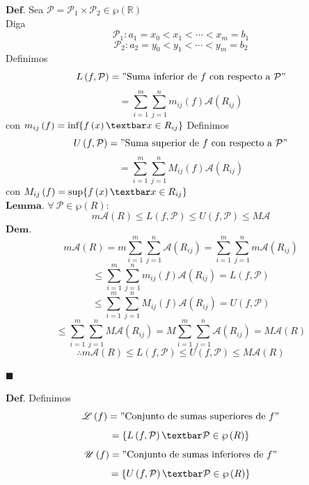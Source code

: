 \documentclass[10pt,a4paper]{article}
\begin{document}
\color{red} 
$\mathbf{Def.}$
\color{black} 
Sea $\mathcal{P} = \mathcal{P_1} \times \mathcal{P_2} \in \wp \left( \mathbb{R} \right)  $ \\
Diga 
$$\mathcal{P}_1: a_1 =x_0 <x_1< \cdots < x_m = b_1  $$
$$\mathcal{P}_2: a_2 =y_0 <y_1< \cdots < y_m = b_2  $$
Definimos 
$$ L \left( f, \mathcal{P} \right) = "\text{Suma inferior de $f$ con respecto a } \mathcal{P} " $$
$$ = \sum_{i=1}^{m} \sum_{j=1}^{n} m_{ij} \left( f \right) \mathcal{A} \left( R_{ij} \right)  $$
con $ m_{ij} \left( f \right) = \text{inf} \{ f \left( x \right) \textbar x \in R_{ij} \}   $ 
\newpage
Definimos 
$$ U \left( f, \mathcal{P} \right) = "\text{Suma superior de $f$ con respecto a } \mathcal{P} " $$
$$ = \sum_{i=1}^{m} \sum_{j=1}^{n} M_{ij} \left( f \right) \mathcal{A} \left( R_{ij} \right)  $$
con $ M_{ij} \left( f \right) = \text{sup} \{ f \left( x \right) \textbar x \in R_{ij} \}   $ \\
\color{red} 
$\mathbf{Lemma.}$
\color{black} 
 $\forall \ \mathcal{P} \in \wp \left( R \right) : $
 $$ m \mathcal{A} \left( R \right) \leq L \left( f,\mathcal{P} \right) \leq U \left( f, \mathcal{P} \right) \leq M \mathcal{A}$$
\color{red} 
$\mathbf{Dem.}$ \\
\color{black} 
$$ m \mathcal{A} \left( R \right) = 
m \sum_{i=1}^{m} \sum_{j=1}^{n} \mathcal{A} \left( R_{ij} \right) =    
 \sum_{i=1}^{m} \sum_{j=1}^{n} m \mathcal{A} \left( R_{ij} \right)     
$$
$$
\leq 
 \sum_{i=1}^{m} \sum_{j=1}^{n} m_{ij} \left( f \right) \mathcal{A} \left( R_{ij} \right)
= L \left( f,\mathcal{P} \right) $$
$$
\leq \sum_{i=1}^{m} \sum_{j=1}^{n} M_{ij} \left( f \right) \mathcal{A} \left( R_{ij} \right) 
= U \left( f, \mathcal{P} \right) 
$$
$$
\leq
\sum_{i=1}^{m} \sum_{j=1}^{n} M  \mathcal{A} \left( R_{ij} \right)  = 
M \sum_{i=1}^{m} \sum_{j=1}^{n}  \mathcal{A} \left( R_{ij} \right) = 
M \mathcal{A} \left( R \right) 
$$
$$ \therefore
m \mathcal{A} \left( R \right) \leq L \left( f ,\mathcal{P} \right) \leq 
U \left( f,\mathcal{P} \right)  \leq M \mathcal{A} \left( R \right) 
$$
\begin{flushright}
$\blacksquare$
\end{flushright}
\color{red} 
$\mathbf{Def.}$
\color{black} 
Definimos 
$$ \mathscr{L} \left( f \right) = " \text{Conjunto de sumas superiores de  } f "  $$
$$ = \{ L \left( f, \mathcal{P} \right) \textbar \mathcal{P} \in \wp \left( R \right)   \}  $$
$$ \mathscr{U} \left( f \right) = " \text{Conjunto de sumas inferiores de  } f "  $$
$$ = \{ U \left( f, \mathcal{P} \right) \textbar \mathcal{P} \in \wp \left( R \right)   \}  $$
\end{document}
